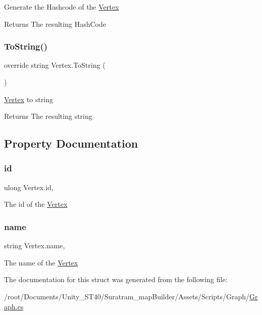 Generate the Hashcode of the \hyperlink{structVertex}{Vertex} 

\begin{DoxyReturn}{Returns}
The resulting Hash\+Code
\end{DoxyReturn}
\mbox{\label{structVertex_a479e4b4c9af138826bc1841b699f5e4b}} 
\subsubsection{\texorpdfstring{To\+String()}{ToString()}}
{\footnotesize\ttfamily override string Vertex.\+To\+String (\begin{DoxyParamCaption}{ }\end{DoxyParamCaption})}



\hyperlink{structVertex}{Vertex} to string 

\begin{DoxyReturn}{Returns}
The resulting string
\end{DoxyReturn}


\subsection{Property Documentation}
\mbox{\label{structVertex_a586a5027b186f95b77920c765d867aea}} 
\subsubsection{\texorpdfstring{id}{id}}
{\footnotesize\ttfamily ulong Vertex.\+id\hspace{0.3cm}{\ttfamily [get]}, {\ttfamily [set]}}



The id of the \hyperlink{structVertex}{Vertex}

\mbox{\label{structVertex_a564e63a0293b07f4ec0d559f7d40cf72}} 
\subsubsection{\texorpdfstring{name}{name}}
{\footnotesize\ttfamily string Vertex.\+name\hspace{0.3cm}{\ttfamily [get]}, {\ttfamily [set]}}



The name of the \hyperlink{structVertex}{Vertex}



The documentation for this struct was generated from the following file\+:\begin{DoxyCompactItemize}
\item 
/root/\+Documents/\+Unity\+\_\+\+S\+T40/\+Suratram\+\_\+map\+Builder/\+Assets/\+Scripts/\+Graph/\hyperlink{Graph_8cs}{Graph.\+cs}\end{DoxyCompactItemize}

